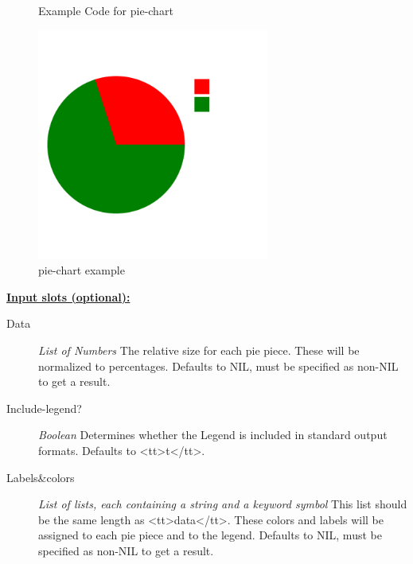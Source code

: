 \documentclass [11pt]{book}
\begin{document}
\begin{itemize}
\begin{figure}
\caption{Example Code for pie-chart}

\label{fig:example-code-pie-chart}

\end{figure}

\begin{figure}
\begin{center}
\includegraphics[width=3in,height=3in]{../images/example-pie-chart.pdf}
\end{center}

\caption{pie-chart example}

\label{fig:pie-chart}

\end{figure}





\textbf{
\underline{Input slots (optional):}}

\begin{description}

\item [Data]
\emph{List of Numbers} The relative size for each pie piece. These will be normalized to percentages.
Defaults to NIL, must be specified as non-NIL to get a result.


\item [Include-legend?]
\emph{Boolean} Determines whether the Legend is included in standard output formats. Defaults to <tt>t</tt>.


\item [Labels&colors]
\emph{List of lists, each containing a string and a keyword symbol} This list should be the same
length as <tt>data</tt>. These colors and labels will be assigned to each pie piece and to the legend.
Defaults to NIL, must be specified as non-NIL to get a result.



\end{description}
\end{itemize}
\end{document}
